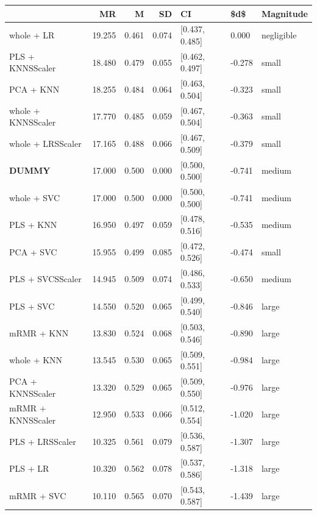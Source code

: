 \documentclass[a4paper,oneside,11pt,leqno]{article}
\begin{document}
	\begin{table}[h]
		\centering
		\begin{tabular}{lrrrlll}
			\toprule
			{} &     MR &     M &    SD &              CI &    \$d\$ &   Magnitude \\
			\midrule
			whole + LR         & 19.255 & 0.461 & 0.074 &  [0.437, 0.485] &  0.000 &  negligible \\
			PLS + KNNSScaler   & 18.480 & 0.479 & 0.055 &  [0.462, 0.497] & -0.278 &       small \\
			PCA + KNN          & 18.255 & 0.484 & 0.064 &  [0.463, 0.504] & -0.323 &       small \\
			whole + KNNSScaler & 17.770 & 0.485 & 0.059 &  [0.467, 0.504] & -0.363 &       small \\
			whole + LRSScaler  & 17.165 & 0.488 & 0.066 &  [0.467, 0.509] & -0.379 &       small \\
			 \textbf{DUMMY}              & 17.000 & 0.500 & 0.000 &  [0.500, 0.500] & -0.741 &      medium \\
			whole + SVC        & 17.000 & 0.500 & 0.000 &  [0.500, 0.500] & -0.741 &      medium \\
			PLS + KNN          & 16.950 & 0.497 & 0.059 &  [0.478, 0.516] & -0.535 &      medium \\
			PCA + SVC          & 15.955 & 0.499 & 0.085 &  [0.472, 0.526] & -0.474 &       small \\
			PLS + SVCSScaler   & 14.945 & 0.509 & 0.074 &  [0.486, 0.533] & -0.650 &      medium \\
			PLS + SVC          & 14.550 & 0.520 & 0.065 &  [0.499, 0.540] & -0.846 &       large \\
			mRMR + KNN         & 13.830 & 0.524 & 0.068 &  [0.503, 0.546] & -0.890 &       large \\
			whole + KNN        & 13.545 & 0.530 & 0.065 &  [0.509, 0.551] & -0.984 &       large \\
			PCA + KNNSScaler   & 13.320 & 0.529 & 0.065 &  [0.509, 0.550] & -0.976 &       large \\
			mRMR + KNNSScaler  & 12.950 & 0.533 & 0.066 &  [0.512, 0.554] & -1.020 &       large \\
			PLS + LRSScaler    & 10.325 & 0.561 & 0.079 &  [0.536, 0.587] & -1.307 &       large \\
			PLS + LR           & 10.320 & 0.562 & 0.078 &  [0.537, 0.586] & -1.318 &       large \\
			mRMR + SVC         & 10.110 & 0.565 & 0.070 &  [0.543, 0.587] & -1.439 &       large \\

\end{tabular}
\end{table}
\end{document}
